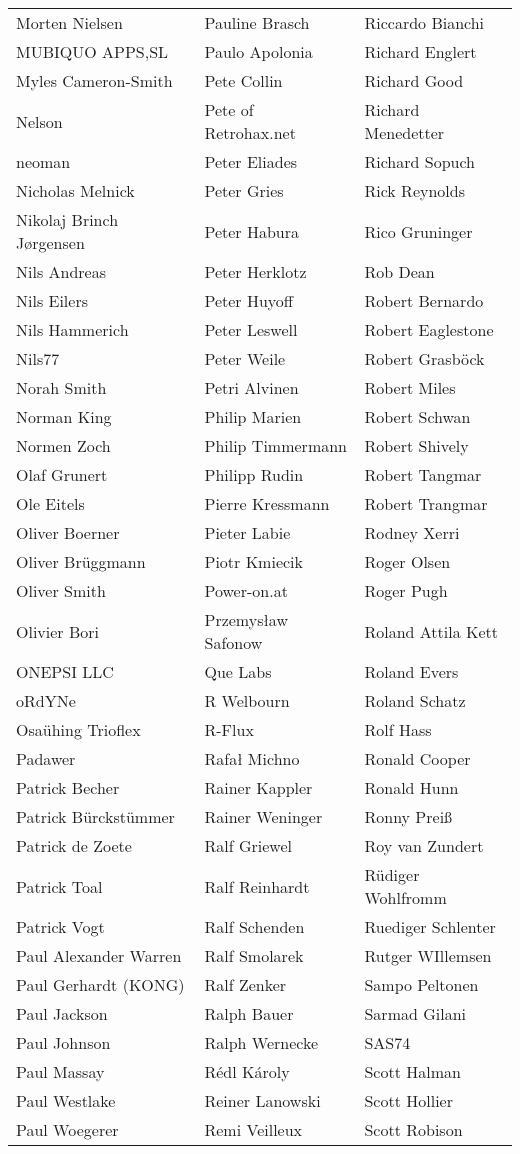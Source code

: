 \begin{tabular}{p{4.5cm}p{4.5cm}p{4.5cm}}
Morten Nielsen & Pauline Brasch & Riccardo Bianchi \\
MUBIQUO APPS,SL & Paulo Apolonia & Richard Englert \\
Myles Cameron-Smith & Pete Collin & Richard Good \\
Nelson & Pete of Retrohax.net & Richard Menedetter \\
neoman & Peter Eliades & Richard Sopuch \\
Nicholas Melnick & Peter Gries & Rick Reynolds \\
Nikolaj Brinch Jørgensen & Peter Habura & Rico Gruninger \\
Nils Andreas & Peter Herklotz & Rob Dean \\
Nils Eilers & Peter Huyoff & Robert Bernardo \\
Nils Hammerich & Peter Leswell & Robert Eaglestone \\
Nils77 & Peter Weile & Robert Grasböck \\
Norah Smith & Petri Alvinen & Robert Miles \\
Norman King & Philip Marien & Robert Schwan \\
Normen Zoch & Philip Timmermann & Robert Shively \\
Olaf Grunert & Philipp Rudin & Robert Tangmar \\
Ole Eitels & Pierre Kressmann & Robert Trangmar \\
Oliver Boerner & Pieter Labie & Rodney Xerri \\
Oliver Brüggmann & Piotr Kmiecik & Roger Olsen \\
Oliver Smith & Power-on.at & Roger Pugh \\
Olivier Bori & Przemysław Safonow & Roland Attila Kett \\
ONEPSI LLC & Que Labs & Roland Evers \\
oRdYNe & R Welbourn & Roland Schatz \\
Osaühing Trioflex & R-Flux & Rolf Hass \\
Padawer & Rafał Michno & Ronald Cooper \\
Patrick Becher & Rainer Kappler & Ronald Hunn \\
Patrick Bürckstümmer & Rainer Weninger & Ronny Preiß \\
Patrick de Zoete & Ralf Griewel & Roy van Zundert \\
Patrick Toal & Ralf Reinhardt & Rüdiger Wohlfromm \\
Patrick Vogt & Ralf Schenden & Ruediger Schlenter \\
Paul Alexander Warren & Ralf Smolarek & Rutger WIllemsen \\
Paul Gerhardt (KONG) & Ralf Zenker & Sampo Peltonen \\
Paul Jackson & Ralph Bauer & Sarmad Gilani \\
Paul Johnson & Ralph Wernecke & SAS74 \\
Paul Massay & Rédl Károly & Scott Halman \\
Paul Westlake & Reiner Lanowski & Scott Hollier \\
Paul Woegerer & Remi Veilleux & Scott Robison \\
\end{tabular}
